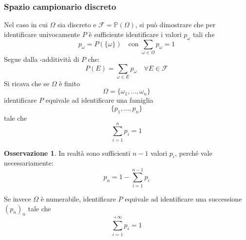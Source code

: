 \documentclass{article}
\theoremstyle{plain}
\theoremstyle{definition}
\newtheorem{osservazione}{Osservazione}[section]
\theoremstyle{remark}
\begin{document}
\subsubsection{Spazio campionario discreto} %
\label{subs:spazio_campionario_discreto}
Nel caso in cui $\Omega$ sia discreto e $\mathscr{F}=\mathds{P}(\Omega)$, si può dimostrare che per identificare univocamente $P$ è sufficiente identificare i valori $p_\omega$ tali che
\begin{equation*}
	p_\omega=P(\{\omega\})\quad\text{con }\sum_{\omega\in\Omega}p_\omega=1
\end{equation*}
Segue dalla \sigma-additività di $P$ che:
\begin{equation*}
	P(E)=\sum_{\omega\in E} p_\omega\quad\forall E\in\mathscr{F}
\end{equation*}
Si ricava che se $\Omega$ è finito
\begin{equation*}
	\Omega=\{\omega_1,...,\omega_n\}
\end{equation*}
identificare $P$ equivale ad identificare una famiglia
\begin{equation*}
	\{p_1,...,p_n\}
\end{equation*}
tale che 
\begin{equation*}
	\sum_{i=1}^n p_i=1
\end{equation*}
\begin{osservazione}
	In realtà sono sufficienti $n-1$ valori $p_i$, perché vale necessariamente:
	\begin{equation*}
		p_n=1-\sum_{i=1}^{n-1}p_i
	\end{equation*}
\end{osservazione}
Se invece $\Omega$ è numerabile, identificare $P$ equivale ad identificare una successione $(p_n)_n$ tale che
\begin{equation*}
	\sum_{i=1}^{+\infty}p_i=1
\end{equation*}
\end{document}
